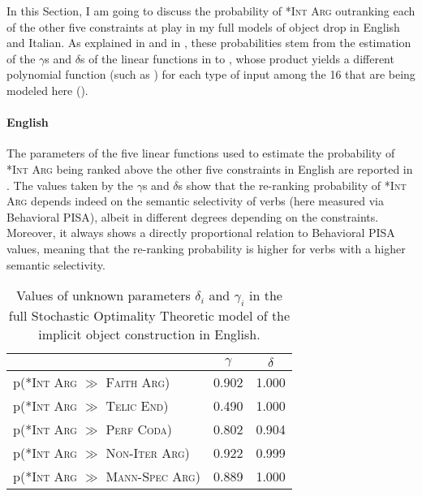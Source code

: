 In this Section, I am going to discuss the probability of \textsc{*Int Arg} outranking each of the other five constraints at play in my full models of object drop in English and Italian. As explained in  and in , these probabilities stem from the estimation of the $\gamma$s and $\delta$s of the linear functions in  to , whose product yields a different polynomial function (such as ) for each type of input among the 16 that are being modeled here ().

\paragraph{English} 
The parameters of the five linear functions used to estimate the probability of \textsc{*Int Arg} being ranked above the other five constraints in English are reported in . The values taken by the $\gamma$s and $\delta$s show that the re-ranking probability of \textsc{*Int Arg} depends indeed on the semantic selectivity of verbs (here measured via Behavioral PISA), albeit in different degrees depending on the constraints. Moreover, it always shows a directly proportional relation to Behavioral PISA values, meaning that the re-ranking probability is higher for verbs with a higher semantic selectivity.

\begin{table}[htb] %
\caption{Values of unknown parameters $\delta_i$ and $\gamma_i$ in the full Stochastic Optimality Theoretic model of the implicit object construction in English.}
\begin{tabular}{l|cc}
                                                                                & $\gamma$ & $\delta$ \\
                                                                                \hline
p(\textsc{*Int Arg} $\gg$ \textsc{Faith Arg}) & 0.902        & 1.000        \\
p(\textsc{*Int Arg} $\gg$ \textsc{Telic End}) & 0.490        & 1.000        \\
p(\textsc{*Int Arg} $\gg$ \textsc{Perf Coda})  & 0.802        & 0.904        \\
p(\textsc{*Int Arg} $\gg$ \textsc{Non-Iter Arg}) & 0.922        & 0.999        \\
p(\textsc{*Int Arg} $\gg$ \textsc{Mann-Spec Arg}) & 0.889        & 1.000       
\end{tabular}
\end{table}


